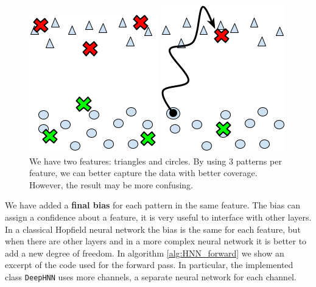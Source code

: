 \begin{figure}[ht]
    \centering
    \begin{minipage}{0.45\textwidth}
        \centering
        \includegraphics[width=0.6\linewidth]{Figures/DeepHNN.png}
    \end{minipage}
    \hfill %
    \begin{minipage}{0.45\textwidth}
        \centering
        \includegraphics[width=0.6\linewidth]{Figures/DeepHNN_1.png}
    \end{minipage}
    \caption{We have two features: triangles and circles. By using $3$ patterns per feature, we can better capture the data with better coverage. However, the result may be more confusing.}
    \label{fig:DeepHNNDiagram}
\end{figure}

\noindent We have added a \textbf{final bias} for each pattern in the same feature. The bias can assign a confidence about a feature, it is very useful to interface with other layers. In a classical Hopfield neural network the bias is the same for each feature, but when there are other layers and in a more complex neural network it is better to add a new degree of freedom. In algorithm \ref{alg:HNN_forward} we show an excerpt of the code used for the forward pass. In particular, the implemented class \texttt{DeepHNN} uses more channels, a separate neural network for each channel.

